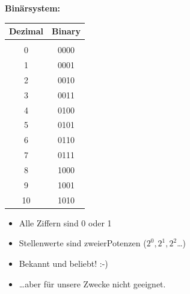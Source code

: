\documentclass{beamer}
\begin{document}

\begin{frame}
\textbf{Binärsystem:}

\begin{multicols}{2}

\begin{tabular}{c|c}
Dezimal & Binary \\ 
\hline
&\\
0&0000\\
1&0001\\
2&0010\\
3&0011\\
4&0100\\
5&0101\\
6&0110\\
7&0111\\
8&1000\\
9&1001\\
10&1010\\
\end{tabular}
\columnbreak
\pause

\begin{itemize}
\item Alle Ziffern sind 0 oder 1\pause
\item Stellenwerte sind zweierPotenzen ($2^0, 2^1, 2^2$\dots)\pause
\item Bekannt und beliebt! :-)\pause
\item \dots aber für unsere Zwecke nicht geeignet.
\end{itemize}

\end{multicols}
\end{frame}

\end{document}
